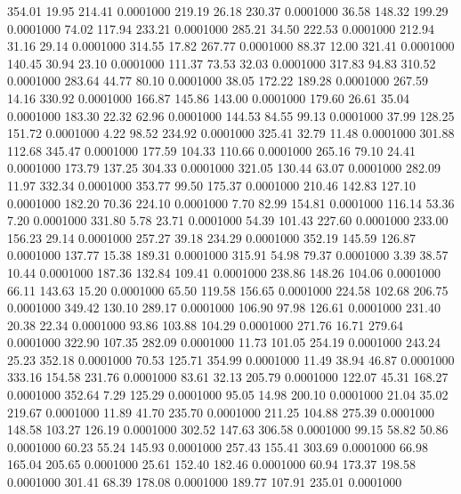  354.01   19.95  214.41   0.0001000
 219.19   26.18  230.37   0.0001000
  36.58  148.32  199.29   0.0001000
  74.02  117.94  233.21   0.0001000
 285.21   34.50  222.53   0.0001000
 212.94   31.16   29.14   0.0001000
 314.55   17.82  267.77   0.0001000
  88.37   12.00  321.41   0.0001000
 140.45   30.94   23.10   0.0001000
 111.37   73.53   32.03   0.0001000
 317.83   94.83  310.52   0.0001000
 283.64   44.77   80.10   0.0001000
  38.05  172.22  189.28   0.0001000
 267.59   14.16  330.92   0.0001000
 166.87  145.86  143.00   0.0001000
 179.60   26.61   35.04   0.0001000
 183.30   22.32   62.96   0.0001000
 144.53   84.55   99.13   0.0001000
  37.99  128.25  151.72   0.0001000
   4.22   98.52  234.92   0.0001000
 325.41   32.79   11.48   0.0001000
 301.88  112.68  345.47   0.0001000
 177.59  104.33  110.66   0.0001000
 265.16   79.10   24.41   0.0001000
 173.79  137.25  304.33   0.0001000
 321.05  130.44   63.07   0.0001000
 282.09   11.97  332.34   0.0001000
 353.77   99.50  175.37   0.0001000
 210.46  142.83  127.10   0.0001000
 182.20   70.36  224.10   0.0001000
   7.70   82.99  154.81   0.0001000
 116.14   53.36    7.20   0.0001000
 331.80    5.78   23.71   0.0001000
  54.39  101.43  227.60   0.0001000
 233.00  156.23   29.14   0.0001000
 257.27   39.18  234.29   0.0001000
 352.19  145.59  126.87   0.0001000
 137.77   15.38  189.31   0.0001000
 315.91   54.98   79.37   0.0001000
   3.39   38.57   10.44   0.0001000
 187.36  132.84  109.41   0.0001000
 238.86  148.26  104.06   0.0001000
  66.11  143.63   15.20   0.0001000
  65.50  119.58  156.65   0.0001000
 224.58  102.68  206.75   0.0001000
 349.42  130.10  289.17   0.0001000
 106.90   97.98  126.61   0.0001000
 231.40   20.38   22.34   0.0001000
  93.86  103.88  104.29   0.0001000
 271.76   16.71  279.64   0.0001000
 322.90  107.35  282.09   0.0001000
  11.73  101.05  254.19   0.0001000
 243.24   25.23  352.18   0.0001000
  70.53  125.71  354.99   0.0001000
  11.49   38.94   46.87   0.0001000
 333.16  154.58  231.76   0.0001000
  83.61   32.13  205.79   0.0001000
 122.07   45.31  168.27   0.0001000
 352.64    7.29  125.29   0.0001000
  95.05   14.98  200.10   0.0001000
  21.04   35.02  219.67   0.0001000
  11.89   41.70  235.70   0.0001000
 211.25  104.88  275.39   0.0001000
 148.58  103.27  126.19   0.0001000
 302.52  147.63  306.58   0.0001000
  99.15   58.82   50.86   0.0001000
  60.23   55.24  145.93   0.0001000
 257.43  155.41  303.69   0.0001000
  66.98  165.04  205.65   0.0001000
  25.61  152.40  182.46   0.0001000
  60.94  173.37  198.58   0.0001000
 301.41   68.39  178.08   0.0001000
 189.77  107.91  235.01   0.0001000
